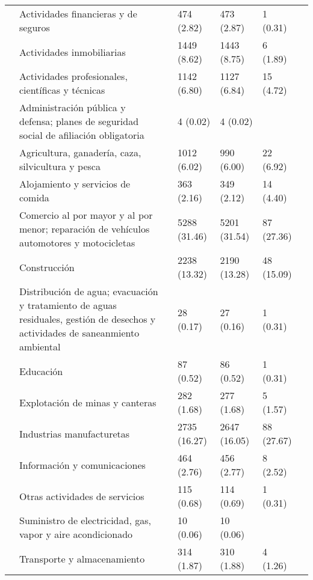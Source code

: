\begin{tabular}{lllllll}
{{ & Actividades financieras y de seguros &  & 474 (2.82) & 473 (2.87) & 1 (0.31) &  \\
 & Actividades inmobiliarias &  & 1449 (8.62) & 1443 (8.75) & 6 (1.89) &  \\
 & Actividades profesionales,  científicas y técnicas &  & 1142 (6.80) & 1127 (6.84) & 15 (4.72) &  \\
 & Administración pública y defensa; planes de seguridad social de afiliación obligatoria &  & 4 (0.02) & 4 (0.02) &  &  \\
 & Agricultura, ganadería, caza, silvicultura y pesca &  & 1012 (6.02) & 990 (6.00) & 22 (6.92) &  \\
 & Alojamiento y servicios de comida &  & 363 (2.16) & 349 (2.12) & 14 (4.40) &  \\
 & Comercio al por mayor y al por menor; reparación de vehículos automotores y motocicletas &  & 5288 (31.46) & 5201 (31.54) & 87 (27.36) &  \\
 & Construcción &  & 2238 (13.32) & 2190 (13.28) & 48 (15.09) &  \\
 & Distribución de agua; evacuación y tratamiento de aguas residuales, gestión de desechos y actividades de saneanmiento ambiental &  & 28 (0.17) & 27 (0.16) & 1 (0.31) &  \\
 & Educación &  & 87 (0.52) & 86 (0.52) & 1 (0.31) &  \\
 & Explotación de minas y canteras &  & 282 (1.68) & 277 (1.68) & 5 (1.57) &  \\
 & Industrias manufacturetas &  & 2735 (16.27) & 2647 (16.05) & 88 (27.67) &  \\
 & Información y comunicaciones &  & 464 (2.76) & 456 (2.77) & 8 (2.52) &  \\
 & Otras actividades de servicios &  & 115 (0.68) & 114 (0.69) & 1 (0.31) &  \\
 & Suministro de electricidad, gas, vapor y aire acondicionado &  & 10 (0.06) & 10 (0.06) &  &  \\
 & Transporte y almacenamiento &  & 314 (1.87) & 310 (1.88) & 4 (1.26) &  \\
\cline{1-7}
\bottomrule
\end{tabular}

